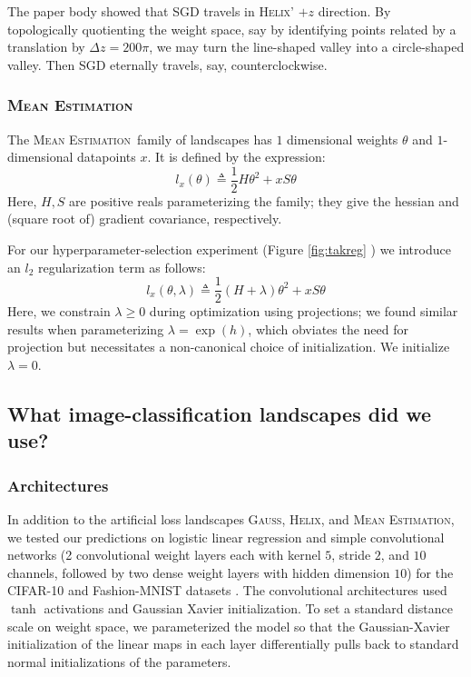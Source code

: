 \documentclass[final,12pt]{colt2021} %
\newcommand{\ofthree}[1]{
    {\tiny \raisebox{0.04cm}{$
        \ifthenelse{\equal{#1}{0}}{{\color{moor}\blacksquare}}{\square}
        \ifthenelse{\equal{#1}{1}}{{\color{moor}\blacksquare}}{\square}    
        \ifthenelse{\equal{#1}{2}}{{\color{moor}\blacksquare}}{\square}
    $}}%
}
\newcommand{\Gauss}{\textsc{Gauss}}
\newcommand{\Helix}{\textsc{Helix}}
\newcommand{\MeanEstimation}{\textsc{Mean Estimation}}
\begin{document}
            The paper body showed that SGD travels in \Helix' $+z$
            direction.  By topologically quotienting the weight space, say by
            identifying points related by a translation by $\Delta z = 200\pi$,
            we may turn the line-shaped valley into a circle-shaped valley.
            Then SGD eternally travels, say, counterclockwise.
           
        \subsubsection{\MeanEstimation}
            The \MeanEstimation\, family of landscapes has $1$ dimensional
            weights $\theta$ and $1$-dimensional datapoints $x$.  It is defined
            by the expression:
            $$
                l_x(\theta)
                \triangleq
                \frac{1}{2} H \theta^2 + x S \theta
            $$
            Here, $H, S$ are positive reals parameterizing the family; they
            give the hessian and (square root of) gradient covariance,
            respectively.

            For our hyperparameter-selection experiment (Figure
            \ref{fig:takreg}\ofthree{2}) we introduce an $l_2$
            regularization term as follows:
            $$
                l_x(\theta, \lambda)
                \triangleq
                \frac{1}{2} (H + \lambda) \theta^2 + x S \theta
            $$
            Here, we constrain $\lambda\geq 0$ during optimization using
            projections; we found similar results when parameterizing $\lambda
            = \exp(h)$, which obviates the need for projection but necessitates
            a non-canonical choice of initialization.  We initialize
            $\lambda=0$.

    \subsection{What image-classification landscapes did we use?}   \label{appendix:natural}

        \subsubsection{Architectures}
            In addition to the artificial loss landscapes
            \Gauss, \Helix, and \MeanEstimation, 
            we tested our predictions on logistic linear regression
            and simple convolutional networks (2 convolutional weight layers
            each with kernel $5$, stride $2$, and $10$ channels, followed by
            two dense weight layers with hidden dimension $10$) for the
            CIFAR-10 \cite{kr09} and Fashion-MNIST datasets \cite{xi17}.  The
            convolutional architectures used $\tanh$ activations and Gaussian
            Xavier initialization.  To set a standard distance scale on weight
            space, we parameterized the model so that the
            Gaussian-Xavier initialization of the linear maps in each layer
            differentially pulls back to standard normal initializations of the
            parameters.
            
\end{document}
